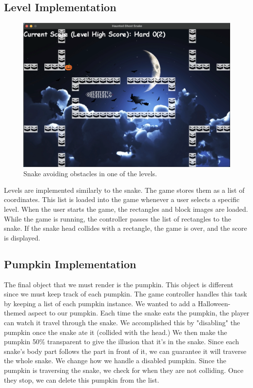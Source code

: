 \documentclass[sigplan,screen]{acmart}
\begin{document}
\subsection{Level Implementation}

\begin{figure}[h]
  \centering
  \includegraphics[width=\linewidth]{gameplay_static_level}
  \caption{Snake avoiding obstacles in one of the levels.}
\end{figure}

Levels are implemented similarly to the snake. The game stores them as a list of coordinates. This list is loaded into the game whenever a user selects a specific level. When the user starts the game, the rectangles and block images are loaded. While the game is running, the controller passes the list of rectangles to the snake. If the snake head collides with a rectangle, the game is over, and the score is displayed. 

\subsection{Pumpkin Implementation}

The final object that we must render is the pumpkin. This object is different since we must keep track of each pumpkin. The game controller handles this task by keeping a list of each pumpkin instance. We wanted to add a Halloween-themed aspect to our pumpkin. Each time the snake eats the pumpkin, the player can watch it travel through the snake. We accomplished this by "disabling" the pumpkin once the snake ate it (collided with the head.) We then make the pumpkin 50\% transparent to give the illusion that it's in the snake. Since each snake's body part follows the part in front of it, we can guarantee it will traverse the whole snake. We change how we handle a disabled pumpkin. Since the pumpkin is traversing the snake, we check for when they are not colliding. Once they stop, we can delete this pumpkin from the list. 
\end{document}
